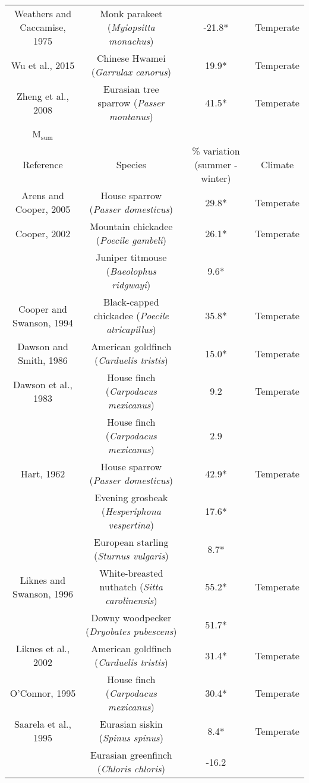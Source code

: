 \documentclass[10pt, twoside]{book} %
\begin{document}
\begin{table}[!ht]
\begin{adjustbox}{max width=\textwidth}
\begin{tabular}{cccc}
        Weathers and Caccamise, 1975 & Monk parakeet (\textit{Myiopsitta monachus}) & -21.8* & Temperate \\ 
        Wu et al., 2015 & Chinese Hwamei (\textit{Garrulax canorus}) & 19.9* & Temperate \\ 
        Zheng et al., 2008 & Eurasian tree sparrow (\textit{Passer montanus}) & 41.5* & Temperate \\ 
        M$_{\text{sum}}$ & ~ & ~ & ~ \\ 
        Reference & Species & \% variation (summer - winter) & Climate \\ 
        Arens and Cooper, 2005 & House sparrow (\textit{Passer domesticus}) & 29.8* & Temperate \\ 
        Cooper, 2002 & Mountain chickadee (\textit{Poecile gambeli}) & 26.1* & Temperate \\ 
        ~ & Juniper titmouse (\textit{Baeolophus ridgwayi}) & 9.6* & ~ \\ 
        Cooper and Swanson, 1994 & Black-capped chickadee (\textit{Poecile atricapillus}) & 35.8* & Temperate \\ 
        Dawson and Smith, 1986 & American goldfinch (\textit{Carduelis tristis}) & 15.0* & Temperate \\ 
        Dawson et al., 1983 & House finch (\textit{Carpodacus mexicanus}) & 9.2 & Temperate \\ 
        ~ & House finch (\textit{Carpodacus mexicanus}) & 2.9 & ~ \\ 
        Hart, 1962 & House sparrow (\textit{Passer domesticus}) & 42.9* & Temperate \\ 
        ~ & Evening grosbeak (\textit{Hesperiphona vespertina}) & 17.6* & ~ \\ 
        ~ & European starling (\textit{Sturnus vulgaris}) & 8.7* & ~ \\ 
        Liknes and Swanson, 1996 & White-breasted nuthatch (\textit{Sitta carolinensis}) & 55.2* & Temperate \\ 
        ~ & Downy woodpecker (\textit{Dryobates pubescens}) & 51.7* & ~ \\ 
        Liknes et al., 2002 & American goldfinch (\textit{Carduelis tristis}) & 31.4* & Temperate \\ 
        O’Connor, 1995 & House finch (\textit{Carpodacus mexicanus}) & 30.4* & Temperate \\ 
        Saarela et al., 1995 & Eurasian siskin (\textit{Spinus spinus}) & 8.4* & Temperate \\ 
        ~ & Eurasian greenfinch (\textit{Chloris chloris}) & -16.2 & ~ \\ 

\end{tabular}
\end{adjustbox}
\end{table}
\end{document}
